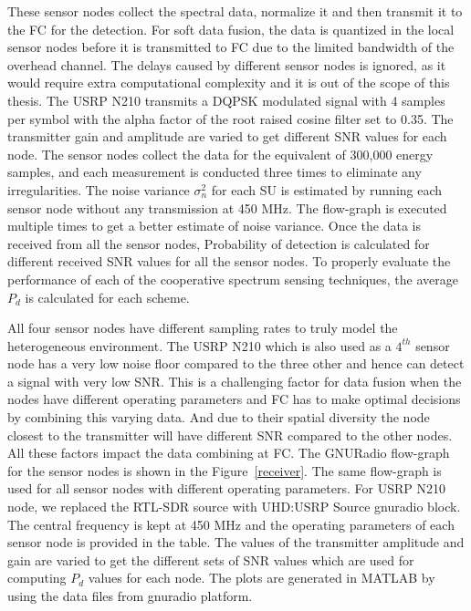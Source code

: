 These sensor nodes collect the spectral data, normalize it and then transmit it to the FC for the detection. For soft data fusion, the data is quantized in the local sensor nodes before it is transmitted to FC due to the limited bandwidth of the overhead channel. The delays caused by different sensor nodes is ignored, as it would require extra computational complexity and it is out of the scope of this thesis. The USRP N210 transmits a DQPSK modulated signal with 4 samples per symbol with the alpha factor of the root raised cosine filter set to 0.35. The transmitter gain and amplitude are varied to get different SNR values for each node. The sensor nodes collect the data for the equivalent of 300,000 energy samples, and each measurement is conducted three times to eliminate any irregularities. The noise variance $\sigma_n^2$ for each SU is estimated by running each sensor node without any transmission at 450 MHz. The flow-graph is executed multiple times to get a better estimate of noise variance. Once the data is received from all the sensor nodes, Probability of detection is calculated for different received SNR values for all the sensor nodes. To properly evaluate the performance of each of the cooperative spectrum sensing techniques, the average $P_d$ is calculated for each scheme. 

All four sensor nodes have different sampling rates to truly model the heterogeneous environment. The USRP N210 which is also used as a $4^{th}$ sensor node has a very low noise floor compared to the three other and hence can detect a signal with very low SNR. This is a challenging factor for data fusion when the nodes have different operating parameters and FC has to make optimal decisions by combining this varying data. And due to their spatial diversity the node closest to the transmitter will have different SNR compared to the other nodes. All these factors impact the data combining at FC. The GNURadio flow-graph for the sensor nodes is shown in the Figure~\ref{receiver}. The same flow-graph is used for all sensor nodes with different operating parameters. For USRP N210 node, we replaced the RTL-SDR source with UHD:USRP Source gnuradio block. The central frequency is kept at 450 MHz and the operating parameters of each sensor node is provided in the table. The values of the transmitter amplitude and gain are varied to get the different sets of SNR values which are used for computing $P_d$ values for each node. The plots are generated in MATLAB by using the data files from gnuradio platform.

